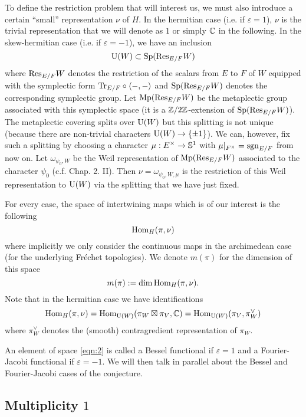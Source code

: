 To define the restriction problem that will interest us, we must also introduce a certain “small” representation $\nu$ of $H$.
In the hermitian case (i.e. if $\varepsilon = 1$), $\nu$ is the trivial representation that we will denote as $1$ or simply $\mathbb{C}$ in the following.
In the skew-hermitian case (i.e. if $\varepsilon = -1
$), we have an inclusion
\[
    \mathrm{U}(W) \subset \mathrm{Sp}(\mathrm{Res}_{E/F}W)
\]
where $\mathrm{Res}_{E/F}W$ denotes the restriction of the scalars from $E$ to $F$ of $W$ equipped with the symplectic form $\mathrm{Tr}_{E/F} \circ \langle -, -\rangle$ and $\mathrm{Sp}(\mathrm{Res}_{E/F}W)$ denotes the corresponding symplectic group.
Let $\mathrm{Mp}(\mathrm{Res}_{E/F}W)$ be the metaplectic group associated with this symplectic space (it is a $\mathbb{Z}/2\mathbb{Z}$-extension of $\mathrm{Sp}(\mathrm{Res}_{E/F}W)$).
The metaplectic covering splits over $\mathrm{U}(W)$ but this splitting is not unique (because there are non-trivial characters $\mathrm{U}(W) \to \{\pm 1\}$).
We can, however, fix such a splitting by choosing a character $\mu: E^\times \to \mathbb{S}^1$ with $\mu|_{F^\times} = \mathrm{sgn}_{E/F}$ from now on.
Let $\omega_{\psi_0, W}$ be the Weil representation of $\mathrm{Mp}(\mathrm{Res}_{E/F} W)$ associated to the character $\psi_0$ (c.f. \cite{moeglin2006correspondances} Chap. 2. II).
Then $\nu = \omega_{\psi_0, W, \mu}$ is the restriction of this Weil representation to $\mathrm{U}(W)$ via the splitting that we have just fixed.

For every case, the space of intertwining maps which is of our interest is the following
\begin{equation}
    \label{eqn:2}
    \mathrm{Hom}_H(\pi, \nu)
\end{equation}
where implicitly we only consider the continuous maps in the archimedean case (for the underlying Fr\'echet topologies).
We denote $m(\pi)$ for the dimension of this space
\[
    m(\pi):= \dim \mathrm{Hom}_H(\pi, \nu).
\]
Note that in the hermitian case we have identifications
\[
    \mathrm{Hom}_H(\pi, \nu) = \mathrm{Hom}_{\mathrm{U}(W)}(\pi_W \boxtimes \pi_V, \mathbb{C}) = \mathrm{Hom}_{\mathrm{U}(W)}(\pi_V, \pi_W^\vee)
\]
where $\pi_W^\vee$ denotes the (smooth) contragredient representation of $\pi_W$.

An element of space \eqref{eqn:2} is called a Bessel functional if $\varepsilon = 1$ and a Fourier-Jacobi functional if $\varepsilon =-1$.
We will then talk in parallel about the Bessel and Fourier-Jacobi cases of the conjecture.


\subsection{Multiplicity $1$}

